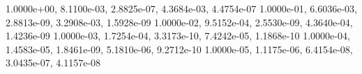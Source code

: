 1.0000e+00, 8.1100e-03, 2.8825e-07, 4.3684e-03, 4.4754e-07 
1.0000e-01, 6.6036e-03, 2.8813e-09, 3.2908e-03, 1.5928e-09 
1.0000e-02, 9.5152e-04, 2.5530e-09, 4.3640e-04, 1.4236e-09 
1.0000e-03, 1.7254e-04, 3.3173e-10, 7.4242e-05, 1.1868e-10 
1.0000e-04, 1.4583e-05, 1.8461e-09, 5.1810e-06, 9.2712e-10 
1.0000e-05, 1.1175e-06, 6.4154e-08, 3.0435e-07, 4.1157e-08 
